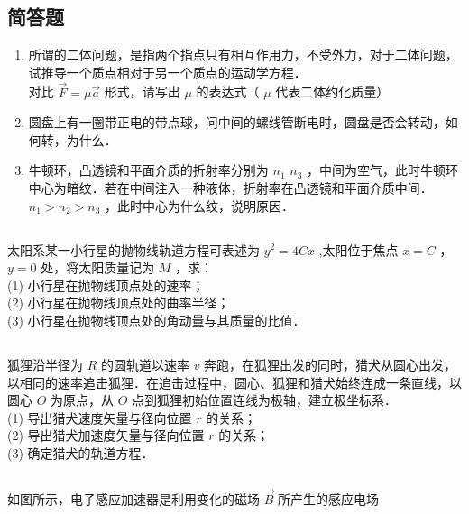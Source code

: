 \subsection{简答题}

\begin{enumerate}

\item 所谓的二体问题，是指两个指点只有相互作用力，不受外力，对于二体问题，试推导一个质点相对于另一个质点的运动学方程．\\
对比 $\vec{F} = \mu \vec{a}$ 形式，请写出 $\mu$ 的表达式（ $\mu$ 代表二体约化质量）

\item 圆盘上有一圈带正电的带点球，问中间的螺线管断电时，圆盘是否会转动，如何转，为什么．

\item 牛顿环，凸透镜和平面介质的折射率分别为 $n_{1}$ $n_{3}$ ，中间为空气，此时牛顿环中心为暗纹．若在中间注入一种液体，折射率在凸透镜和平面介质中间．$n_{1}>n_{2}>n_{3}$ ，此时中心为什么纹，说明原因．

\end{enumerate}

\subsection{ }
太阳系某一小行星的抛物线轨道方程可表述为 $y^{2} = 4Cx$ ,太阳位于焦点 $x = C$ ，$y = 0$ 处，将太阳质量记为 $M$ ，求：\\
(1) 小行星在抛物线顶点处的速率；\\
(2) 小行星在抛物线顶点处的曲率半径；\\
(3) 小行星在抛物线顶点处的角动量与其质量的比值．\\

\subsection{ }
狐狸沿半径为 $R$ 的圆轨道以速率 $v$ 奔跑，在狐狸出发的同时，猎犬从圆心出发，以相同的速率追击狐狸．在追击过程中，圆心、狐狸和猎犬始终连成一条直线，以圆心 $O$ 为原点，从 $O$ 点到狐狸初始位置连线为极轴，建立极坐标系．\\
(1) 导出猎犬速度矢量与径向位置 $r$ 的关系；\\
(2) 导出猎犬加速度矢量与径向位置 $r$ 的关系；\\
(3) 确定猎犬的轨道方程．

\subsection{ }
如图所示，电子感应加速器是利用变化的磁场 $\vec{B}$ 所产生的感应电场